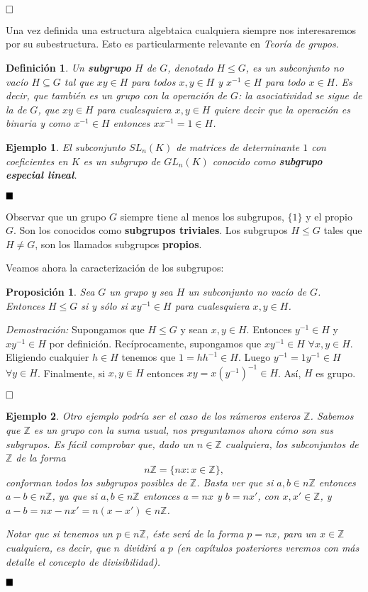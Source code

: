 \documentclass[12pt]{article}
\newtheorem{proposition}[theorem]{Proposición}
\newtheorem{definition}[theorem]{Definición}
\newtheorem{example}{Ejemplo}[theorem]
\begin{document}
$\hfill \square$

Una vez definida una estructura algebtaica cualquiera siempre nos interesaremos por su subestructura. Esto es particularmente relevante en \textit{Teoría de grupos}.

\begin{definition}Un \textbf{subgrupo} $H$ de $G$, denotado $H \leq G$, es un subconjunto no vacío $H \subseteq G$ tal que $xy \in H$ para todos $x,y \in H$ y $x^{-1} \in H$ para todo $x \in H$. Es decir, que también es un grupo con la operación de $G$: la asociatividad se sigue de la de $G$, que $xy \in H$ para cualesquiera $x,y \in H$ quiere decir que la operación es binaria y como $x^{-1} \in H$ entonces $xx^{-1} = 1 \in H$.
\end{definition}

\begin{example}El subconjunto $SL_{n}(K)$ de matrices de determinante $1$ con coeficientes en $K$ es un subgrupo de $GL_n(K)$ conocido como \textbf{subgrupo especial lineal}.
\end{example}
$\hfill \blacksquare$

Observar que un grupo $G$ siempre tiene al menos los subgrupos, $\lbrace 1 \rbrace$ y el propio $G$. Son los conocidos como \textbf{subgrupos triviales}. Los subgrupos $H \leq G $ tales que $H \neq G$, son los llamados subgrupos \textbf{propios}.

Veamos ahora la caracterización de los subgrupos: 

\begin{proposition}Sea $G$ un grupo y sea $H$ un subconjunto no vacío de $G$. Entonces $H \leq G$ si y sólo si $xy^{-1} \in H$ para cualesquiera $x,y \in H$.
\end{proposition}
\emph{Demostración: }
Supongamos que $H \leq G$ y sean $x,y \in H$. Entonces $y^{-1} \in H$ y $xy^{-1} \in H$ por definición. Recíprocamente, supongamos que $xy^{-1} \in H$ $\forall x,y \in H$. Eligiendo cualquier $h \in H$ tenemos que $1 = h h^{-1} \in H$. Luego $y^{-1} = 1y^{-1} \in H$ $\forall y \in H$. Finalmente, si $x,y \in H$ entonces $xy = x(y^{-1})^{-1} \in H$. Así, $H$ es grupo.

$\hfill \square$

\begin{example}Otro ejemplo podría ser el caso de los números enteros $\mathbb{Z}$. Sabemos que $\mathbb{Z}$ es un grupo con la suma usual, nos preguntamos ahora cómo son sus subgrupos. Es fácil comprobar que, dado un $n\in \mathbb{Z}$ cualquiera, los subconjuntos de $\mathbb{Z}$ de la forma $$n\mathbb{Z} = \lbrace nx: x \in \mathbb{Z} \rbrace,$$ conforman todos los subgrupos posibles de $\mathbb{Z}$. Basta ver que si $a,b \in n\mathbb{Z}$ entonces $a-b \in n\mathbb{Z}$, ya que si $a,b\in n\mathbb{Z}$ entonces $a=nx $ y $b = nx'$, con $x,x' \in \mathbb{Z}$, y $a-b = nx -nx' = n(x-x') \in n\mathbb{Z}$.

Notar que si tenemos un $p \in n\mathbb{Z}$, éste será de la forma $p = nx$, para un $x \in \mathbb{Z}$ cualquiera, es decir, que $n$ dividirá a $p$ (en capítulos posteriores veremos con más detalle el concepto de divisibilidad).
\end{example}
$\hfill \blacksquare$
\end{document}
